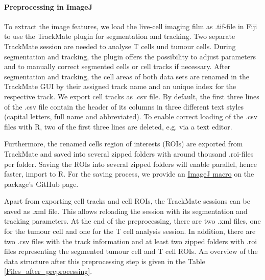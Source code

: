 \documentclass{report}
\begin{document}
\paragraph{Preprocessing in ImageJ} 
To extract the image features, we load the live-cell imaging film as .tif-file in Fiji to use the TrackMate plugin for segmentation and tracking. Two separate TrackMate session are needed to analyse T cells und tumour cells. During segmentation and tracking, the plugin offers the possibility to adjust parameters and to manually correct segmented cells or cell tracks if necessary. After segmentation and tracking, the cell areas of both data sets are renamed in the TrackMate GUI by their assigned track name and an unique index for the respective track. We export cell tracks as .csv file. By default, the first three lines of the .csv file contain the header of its columns in three different text styles (capital letters, full name and abbreviated). To enable correct loading of the .csv files with R, two of the first three lines are deleted, e.g. via a text editor. 

Furthermore, the renamed cells region of interests (ROIs) are exported from TrackMate and saved into several zipped folders with around thousand .roi-files per folder. Saving the ROIs into several zipped folders will enable parallel, hence faster, import to R. For the saving process, we provide an \href{https://github.com/juliaquach02/cellcontacts/blob/main/ImageJ_Macros/Macro_Rename_and_Save_ROIs_in_Subfolders.ijm}{ImageJ macro} on the package's GitHub page.
 
Apart from exporting cell tracks and cell ROIs, the TrackMate sessions can be saved as .xml file. This allows reloading the session with its segmentation and tracking parameters. 
At the end of the preprocessing, there are two .xml files, one for the tumour cell and one for the T cell analysis session. In addition, there are two .csv files with the track information and at least two zipped folders with .roi files representing the segmented tumour cell and T cell ROIs. 
An overview of the data structure after this preprocessing step is given in the Table \ref{Files_after_preprocessing}.
\end{document}
